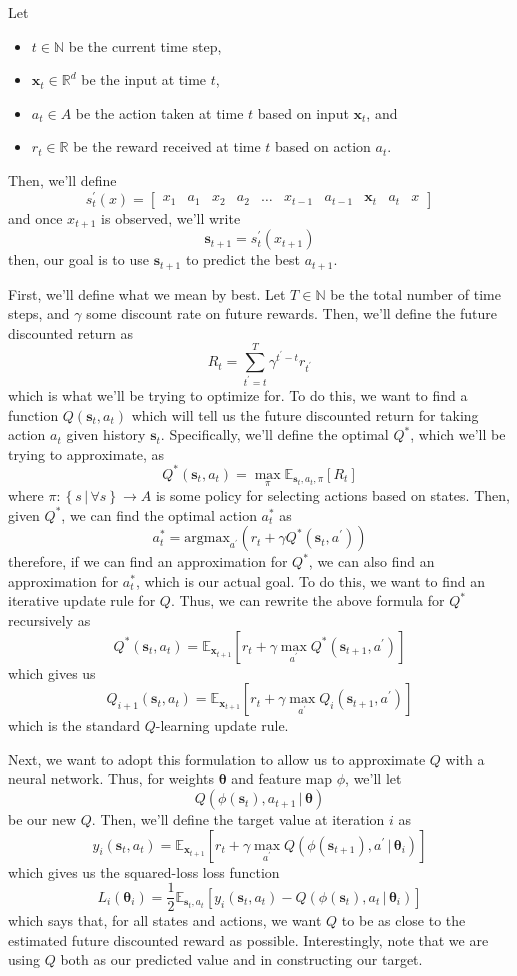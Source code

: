\documentclass[12pt,letterpaper]{hmcpset}
\newcommand{\m}[1]{\begin{bmatrix}#1\end{bmatrix}}
\newcommand{\tx}[1]{\text{#1}}
\newcommand{\pn}[1]{\left(#1\right)}
\newcommand{\bk}[1]{\left[#1\right]}
\newcommand{\set}[1]{\left\{#1\right\}}
\newcommand{\given}{\,|\,}
\newcommand{\bbm}[1]{\mathbb{#1}}
\begin{document}
Let
\begin{itemize}
\item $t \in \bbm N$ be the current time step,
\item $\bm x_t \in \bbm R^d$ be the input at time $t$,
\item $a_t \in A$ be the action taken at time $t$ based on input $\bm x_t$, and
\item $r_t \in \bbm R$ be the reward received at time $t$ based on action $a_t$.
\end{itemize}
Then, we'll define
\[
    s_t^\prime(x) = \m{x_1 & a_1 & x_2 & a_2 & \ldots & x_{t-1} & a_{t-1} & \bm x_t & a_t & x}
\]
and once $x_{t+1}$ is observed, we'll write
\[
    \bm s_{t+1} = s_t^\prime(x_{t+1})
\]
then, our goal is to use $\bm s_{t+1}$ to predict the best $a_{t+1}$.

First, we'll define what we mean by best. Let $T \in \bbm N$ be the total number of time steps, and $\gamma$ some discount rate on future rewards. Then, we'll define the future discounted return as
\[
    R_t = \sum_{t^\prime = t}^T \gamma^{t^\prime - t} r_{t^\prime}
\]
which is what we'll be trying to optimize for. To do this, we want to find a function $Q(\bm s_t, a_t)$ which will tell us the future discounted return for taking action $a_t$ given history $\bm s_t$. Specifically, we'll define the optimal $Q^*$, which we'll be trying to approximate, as
\[
    Q^*(\bm s_t, a_t) = \max_\pi \bbm E_{\bm s_t, a_t, \pi} \bk{R_t}
\]
where $\pi: \set{s \given \forall s} \to A$ is some policy for selecting actions based on states. Then, given $Q^*$, we can find the optimal action $a_t^*$ as
\[
    a_t^* = \tx{argmax}_{a^\prime}\pn{r_t + \gamma Q^*(\bm s_t, a^\prime)}
\]
therefore, if we can find an approximation for $Q^*$, we can also find an approximation for $a_t^*$, which is our actual goal. To do this, we want to find an iterative update rule for $Q$. Thus, we can rewrite the above formula for $Q^*$ recursively as
\[
    Q^*(\bm s_t, a_t) = \bbm E_{\bm x_{t+1}} \bk{r_t + \gamma \max_{a^\prime} Q^*(\bm s_{t+1}, a^\prime)}
\]
which gives us
\[
    Q_{i+1}(\bm s_t, a_t) = \bbm E_{\bm x_{t+1}} \bk{r_t + \gamma \max_{a^\prime} Q_i(\bm s_{t+1}, a^\prime)}
\]
which is the standard $Q$-learning update rule.

Next, we want to adopt this formulation to allow us to approximate $Q$ with a neural network. Thus, for weights $\bm\theta$ and feature map $\phi$, we'll let
\[
    Q(\phi(\bm s_t), a_{t+1} \given \bm\theta)
\]
be our new $Q$. Then, we'll define the target value at iteration $i$ as
\[
    y_i(\bm s_t, a_t) = \bbm E_{\bm x_{t+1}} \bk{r_t + \gamma \max_{a^\prime} Q(\phi(\bm s_{t+1}), a^\prime \given \bm\theta_i)}
\]
which gives us the squared-loss loss function
\[
    L_i(\bm \theta_i) = \frac{1}{2} \bbm E_{\bm s_t, a_t} \bk{y_i(\bm s_t, a_t) - Q(\phi(\bm s_t), a_t \given \bm \theta_i)}
\]
which says that, for all states and actions, we want $Q$ to be as close to the estimated future discounted reward as possible. Interestingly, note that we are using $Q$ both as our predicted value and in constructing our target.
\end{document}
